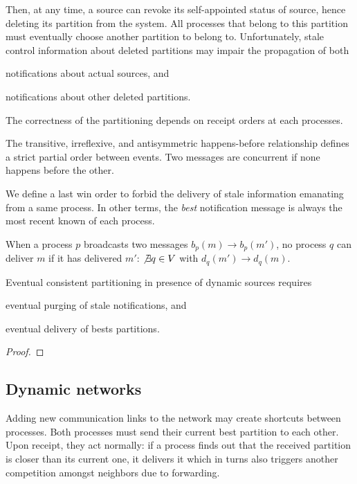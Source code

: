 Then, at any time, a source can revoke its self-appointed status of
source, hence deleting its partition from the system. All processes
that belong to this partition must eventually choose another partition
to belong to. Unfortunately, stale control information about deleted
partitions may impair the propagation of both
\begin{inparaenum}[(i)]
\item notifications about actual sources, and
\item notifications about other deleted partitions.
\end{inparaenum}
The correctness of the partitioning depends on receipt orders at each
processes.

\begin{definition}
  The transitive, irreflexive, and antisymmetric happens-before
  relationship defines a strict partial order between events. Two
  messages are concurrent if none happens before the other.
\end{definition}

We define a last win order to forbid the delivery of stale information
emanating from a same process. In other terms, the \emph{best}
notification message is always the most recent known of each process.
 
\begin{definition}
  When a process $p$ broadcasts two messages $b_p(m) \rightarrow
  b_p(m')$, no process $q$ can deliver $m$ if it has delivered $m'$:
  $\not\exists q \in V$ with $d_q(m') \rightarrow d_q(m)$.
\end{definition}

\begin{theorem}
  Eventual consistent partitioning in presence of dynamic sources
  requires
  \begin{inparaenum}[(i)]
  \item eventual purging of stale notifications, and
  \item eventual delivery of bests partitions.
  \end{inparaenum}
\end{theorem}

\begin{proof}
\end{proof}



\subsection{Dynamic networks}
Adding new communication links to the network may create shortcuts
between processes. Both processes must send their current best
partition to each other. Upon receipt, they act normally: if a process
finds out that the received partition is closer than its current one,
it delivers it which in turns also triggers another competition
amongst neighbors due to forwarding.

